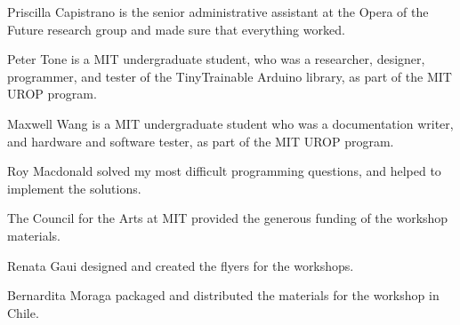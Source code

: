 Priscilla Capistrano is the senior administrative assistant at the Opera of the Future research group and made sure that everything worked.

Peter Tone is a MIT undergraduate student, who was a researcher, designer, programmer, and tester of the TinyTrainable Arduino library, as part of the MIT UROP program.

Maxwell Wang is a MIT undergraduate student who was a documentation writer, and hardware and software tester, as part of the MIT UROP program.

Roy Macdonald solved my most difficult programming questions, and helped to implement the solutions.

The Council for the Arts at MIT provided the generous funding of the workshop materials.

Renata Gaui designed and created the flyers for the workshops.

Bernardita Moraga packaged and distributed the materials for the workshop in Chile.

\newpage
